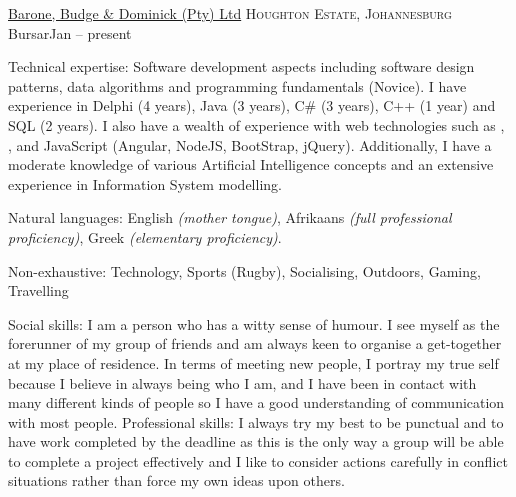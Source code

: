\spacedhrule{0em}{-0.4em}


\headedsection
  {\href{http://www.bbd.co.za}{Barone, Budge \& Dominick (Pty) Ltd}}
  {\textsc{Houghton Estate, Johannesburg}} {%
  \headedsubsection
    {Bursar}{Jan -- present}
    {}
    }
    
\spacedhrule{-0.2em}{-0.4em}



\inlineheadsection  %
  {Technical expertise:}
  {Software development aspects including software design patterns, data algorithms and programming fundamentals (Novice). I have experience in Delphi (4 years), Java (3 years), C\# (3 years), C++ (1 year) and SQL (2 years).  I also have a wealth of experience with web technologies such as , , and JavaScript (Angular, NodeJS, BootStrap, jQuery). Additionally, I have a moderate knowledge of various Artificial Intelligence concepts and an extensive experience in Information System modelling.}

\vspace{0.5em}
\inlineheadsection
  {Natural languages:}
  {English \emph{(mother tongue)}, Afrikaans \emph{(full professional proficiency)}, Greek \emph{(elementary proficiency)}.}


\spacedhrule{1.6em}{-0.4em}

\inlineheadsection
  {Non-exhaustive:}
  {Technology, Sports (Rugby), Socialising, Outdoors, Gaming, Travelling}

  
\spacedhrule{1.6em}{-0.4em}  
  

\inlineheadsection
  {Social skills:}
  {I am a person who has a witty sense of humour. I see myself as the forerunner of my group of friends and am always keen to organise a get-together at my place of residence. In terms of meeting new people, I portray my true self because I believe in always being who I am, and I have been in contact with many different kinds of people so I have a good understanding of communication with most people.}
\inlineheadsection
  {Professional skills:}
  {I always try my best to be punctual and to have work completed by the deadline as this is the only way a group will be able to complete a project effectively and I like to consider actions carefully in conflict situations rather than force my own ideas upon others.}
  
